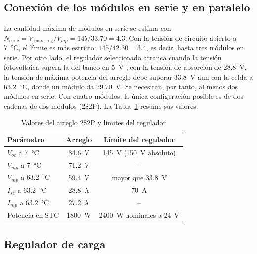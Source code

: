 \subsection{Conexión de los módulos en serie y en paralelo}

La cantidad máxima de módulos en serie se estima con $N_{\mathrm{serie}}=V_{\max,\mathrm{reg}}/V_{mp}=145/33.70=4.3$. Con la tensión de circuito abierto a \SI{7}{\celsius}, el límite es más estricto: $145/42.30=3.4$, es decir, hasta tres módulos en serie. Por otro lado, el regulador seleccionado arranca cuando la tensión fotovoltaica supera la del banco en \SI{5}{V} \cite{victron_mppt}; con la tensión de absorción de \SI{28.8}{V}, la tensión de máxima potencia del arreglo debe superar \SI{33.8}{V} aun con la celda a \SI{63.2}{\celsius}, donde un módulo da \SI{29.70}{V}. Se necesitan, por tanto, al menos dos módulos en serie. Con cuatro módulos, la única configuración posible es de dos cadenas de dos módulos (2S2P). La Tabla~\ref{tab:arreglo} resume sus valores.

\begin{table}[!htb]
\caption{Valores del arreglo 2S2P y límites del regulador}
\label{tab:arreglo}
\centering
\footnotesize
\setlength{\tabcolsep}{4pt}
\begin{tabular}{l c c}
\toprule
Parámetro & Arreglo & Límite del regulador \\
\midrule
$V_{oc}$ a \SI{7}{\celsius} & \SI{84.6}{V} & \SI{145}{V} (\SI{150}{V} absoluto) \\
$V_{mp}$ a \SI{7}{\celsius} & \SI{71.2}{V} & -- \\
$V_{mp}$ a \SI{63.2}{\celsius} & \SI{59.4}{V} & mayor que \SI{33.8}{V} \\
$I_{sc}$ a \SI{63.2}{\celsius} & \SI{28.8}{A} & \SI{70}{A} \\
$I_{mp}$ a \SI{63.2}{\celsius} & \SI{27.2}{A} & -- \\
Potencia en STC & \SI{1800}{W} & \SI{2400}{W} nominales a \SI{24}{V} \\
\bottomrule
\end{tabular}
\end{table}

\subsection{Regulador de carga}

